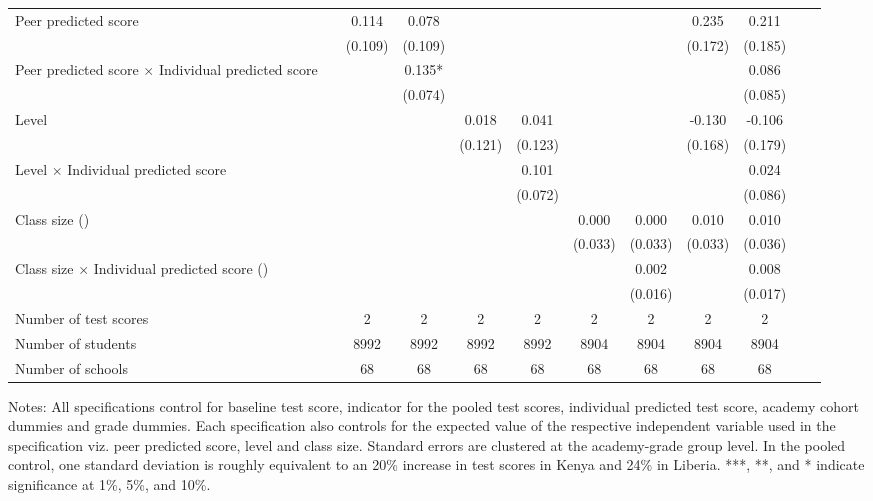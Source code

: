 \begin{center}
\begin{scriptsize}
\begin{threeparttable}
\begin{tabular} {@{} l l c c c c c c c c c c  @{}}
Peer predicted score &  & 0.114 & 0.078 &  &  &  &  & 0.235 & 0.211 \\
                 &  & (0.109) & (0.109) &  &  &  &  & (0.172) & (0.185) \\
Peer predicted score $\times$ Individual predicted score &  &  & 0.135* &  &  &  &  &  & 0.086 \\
                 &  &  & (0.074) &  &  &  &  &  & (0.085) \\
Level &  &  &  & 0.018 & 0.041 &  &  & -0.130 & -0.106 \\
                 &  &  &  & (0.121) & (0.123) &  &  & (0.168) & (0.179) \\
Level $\times$ Individual predicted score &  &  &  &  & 0.101 &  &  &  & 0.024 \\
                 &  &  &  &  & (0.072) &  &  &  & (0.086) \\
Class size (\times 10) &  &  &  &  &  & 0.000 & 0.000 & 0.010 & 0.010 \\
                 &  &  &  &  &  & (0.033) & (0.033) & (0.033) & (0.036) \\
Class size $\times$ Individual predicted score (\times 10) &  &  &  &  &  &  & 0.002 &  & 0.008 \\
                 &  &  &  &  &  &  & (0.016) &  & (0.017) \\
\midrule
Number of test scores &  & 2 & 2 & 2 & 2 & 2 & 2 & 2 & 2 \\
Number of students &  & 8992 & 8992 & 8992 & 8992 & 8904 & 8904 & 8904 & 8904 \\
Number of schools &  & 68 & 68 & 68 & 68 & 68 & 68 & 68 & 68 \\
\bottomrule
\end{tabular}
\begin{tablenotes}
\item Notes: All specifications control for baseline test score, indicator for the pooled test scores, individual predicted test score, academy cohort dummies and grade dummies. Each specification also controls for the expected value of the respective independent variable used in the specification viz. peer predicted score, level and class size. Standard errors are clustered at the academy-grade group level. In the pooled control, one standard deviation is roughly equivalent to an 20\% increase in test scores in Kenya and 24\% in Liberia. ***, **, and * indicate significance at 1\%, 5\%, and 10\%.\end{tablenotes}
\end{threeparttable}
\end{scriptsize}
\end{center}
\clearpage
